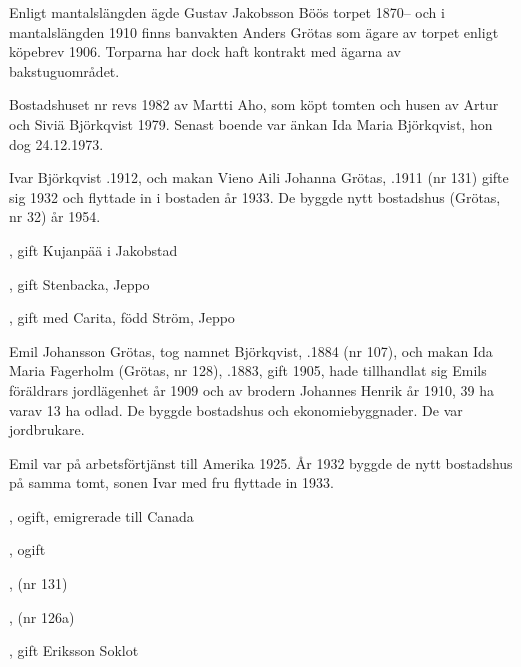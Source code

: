 Enligt  mantalslängden ägde Gustav Jakobsson Böös torpet 1870-- och i mantalslängden 1910 finns banvakten Anders Grötas som ägare av torpet enligt köpebrev 1906. Torparna har dock haft kontrakt med ägarna av bakstuguområdet.






Bostadshuset nr  revs 1982 av Martti Aho, som köpt tomten och husen av Artur och Siviä Björkqvist 1979. Senast boende var änkan Ida Maria Björkqvist, hon dog 24.12.1973.\jhvspace{}


Ivar Björkqvist .1912, och makan Vieno Aili Johanna Grötas, .1911 (nr 131) gifte sig 1932 och flyttade in i bostaden år 1933. De byggde nytt bostadshus (Grötas, nr 32) år 1954.
\begin{jhchildren}
  \item {}, gift Kujanpää i Jakobstad
  \item {}, gift Stenbacka, Jeppo
  \item {}, gift med Carita, född Ström, Jeppo
\end{jhchildren}


Emil Johansson Grötas, tog namnet Björkqvist, .1884 (nr 107), och makan Ida Maria Fagerholm (Grötas, nr 128), .1883, gift 1905, hade tillhandlat sig Emils föräldrars jordlägenhet år 1909 och av brodern Johannes Henrik år 1910, 39 ha varav 13 ha odlad. De byggde bostadshus och ekonomiebyggnader. De var jordbrukare.

Emil var på arbetsförtjänst till Amerika 1925. År 1932 byggde de nytt bostadshus på samma tomt, sonen Ivar med fru flyttade in 1933.
\begin{jhchildren}
  \item {}, ogift, emigrerade till Canada
  \item {}, ogift
  \item {}, (nr 131)
  \item {}, (nr 126a)
  \item {}, gift Eriksson Soklot
\end{jhchildren}


